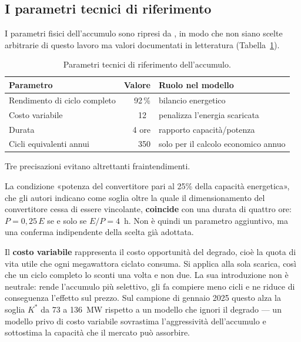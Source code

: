 \subsection{I parametri tecnici di riferimento}
\label{sec:parametri}

I parametri fisici dell'accumulo sono ripresi da \textcite{alonsoperez2026storage}, in modo che
non siano scelte arbitrarie di questo lavoro ma valori documentati in letteratura
(Tabella~\ref{tab:parametri}).

\begin{table}[H]
\centering
\caption{Parametri tecnici di riferimento dell'accumulo.}
\label{tab:parametri}
\begin{tabular}{@{}lrl@{}}
\toprule
\textbf{Parametro} & \textbf{Valore} & \textbf{Ruolo nel modello} \\
\midrule
Rendimento di ciclo completo & 92\,\%          & bilancio energetico \\
Costo variabile              & 12~\euromwh{}   & penalizza l'energia scaricata \\
Durata                       & 4 ore           & rapporto capacit\`a/potenza \\
Cicli equivalenti annui      & 350             & solo per il calcolo economico annuo \\
\bottomrule
\end{tabular}
\end{table}

Tre precisazioni evitano altrettanti fraintendimenti.

La condizione «potenza del convertitore pari al 25\% della capacit\`a energetica», che gli
autori indicano come soglia oltre la quale il dimensionamento del convertitore cessa di essere
vincolante, \textbf{coincide} con una durata di quattro ore: $P = 0{,}25\,E$ se e solo se
$E/P = 4$~h. Non \`e quindi un parametro aggiuntivo, ma una conferma indipendente della scelta
gi\`a adottata.

Il \textbf{costo variabile} rappresenta il costo opportunit\`a del degrado, cio\`e la quota di
vita utile che ogni megawattora ciclato consuma. Si applica alla sola scarica, cos\`i che un
ciclo completo lo sconti una volta e non due. La sua introduzione non \`e neutrale: rende
l'accumulo pi\`u selettivo, gli fa compiere meno cicli e ne riduce di conseguenza l'effetto sul
prezzo. Sul campione di gennaio 2025 questo alza la soglia $K^*$ da 73 a 136~MW rispetto a un
modello che ignori il degrado — un modello privo di costo variabile sovrastima l'aggressivit\`a
dell'accumulo e sottostima la capacit\`a che il mercato pu\`o assorbire.

